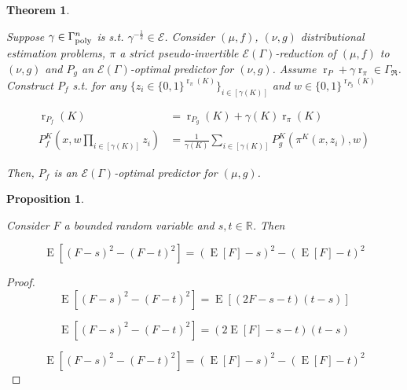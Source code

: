 \documentclass{article}
\numberwithin{equation}{section}
\theoremstyle{definition}
\theoremstyle{plain}
\newtheorem{theorem}{Theorem}[section]
\newtheorem{proposition}{Proposition}[section]
\newcommand{\Bool}{\{0,1\}}
\DeclareMathOperator{\E}{E}
\DeclareMathOperator{\R}{r}
\newcommand{\Reals}{\mathbb{R}}
\newcommand{\GrowR}{\Gamma_{\mathfrak{R}}}
\newcommand{\Fall}{\mathcal{E}}
\newcommand{\EG}{\Fall(\Gamma)}
\newcommand{\BoolR}[1]{\Bool^{\R_{#1}(K)}}
\begin{document}
\begin{samepage}
\begin{theorem}
\label{thm:sp_reduce}

Suppose $\gamma \in \Gamma_{\textnormal{poly}}^n$ is s.t. $\gamma^{-\frac{1}{2}} \in \Fall$. Consider $(\mu,f)$, $(\nu,g)$ distributional estimation problems, $\pi$ a strict pseudo-invertible $\EG$-reduction of $(\mu, f)$ to $(\nu, g)$ and $P_g$ an $\EG$-optimal predictor for $(\nu, g)$. Assume $\R_P + \gamma \R_\pi \in \GrowR$. Construct ${P_f}$  s.t. for any ${\{z_i \in \BoolR{\pi}\}_{i \in [\gamma(K)]}}$ and ${w \in \BoolR{P_g}}$

\begin{align}
\label{eqn:thm__sp_reduce__rpf}\R_{P_f}(K) &= \R_{P_g}(K) + \gamma(K) \R_\pi(K) \\
\label{eqn:thm__sp_reduce__pf}P_f^K(x, w \prod_{i \in [\gamma(K)]} z_i) &= \frac{1}{\gamma(K)}\sum_{i \in [\gamma(K)]} P_g^K(\pi^K(x,z_i),w)
\end{align}


Then, $P_f$ is an $\EG$-optimal predictor for ${(\mu,g)}$.

\end{theorem}
\end{samepage}

\begin{samepage}
\begin{proposition}
\label{prp:ev_diff_sq}

Consider ${F}$ a bounded random variable and ${s,t \in \Reals}$. Then

\begin{equation}
\E[(F - s)^2 - (F - t)^2] = (\E[F] - s)^2 - (\E[F] - t)^2
\end{equation}

\end{proposition}
\end{samepage}

\begin{proof}

\[\E[(F - s)^2 - (F - t)^2] = \E[(2F - s - t)(t-s)]\]

\[\E[(F - s)^2 - (F - t)^2] = (2\E[F] - s - t)(t-s)\]

\[\E[(F - s)^2 - (F - t)^2] = (\E[F] - s)^2 - (\E[F] - t)^2\]
%
\end{proof}
\end{document}
